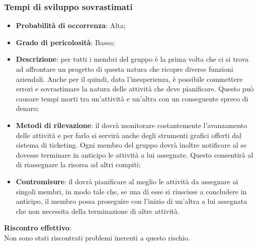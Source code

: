 		\subsubsection{Tempi di sviluppo sovrastimati} %
		\label{ssub:tempi_di_sviluppo_sovrastimati}
			\begin{itemize}
				\item \textbf{Probabilità di occorrenza}: Alta;
				\item \textbf{Grado di pericolosità}: Basso;
				\item \textbf{Descrizione}: per tutti i membri del gruppo è la prima volta che ci si trova ad affrontare un progetto di questa natura che ricopre diverse funzioni aziendali. Anche per il \roleProjectManager{} quindi, data l'inesperienza, è possibile commettere errori e sovrastimare la natura delle attività che deve pianificare. Questo può causare tempi morti tra un'attività e un'altra con un conseguente spreco di denaro;
				\item \textbf{Metodi di rilevazione}: il \roleProjectManager{} dovrà monitorare costantemente l'avanzamento delle attività e per farlo si servirà anche degli strumenti grafici offerti dal sistema di ticketing. Ogni membro del gruppo dovrà inoltre notificare al \roleProjectManager{} se dovesse terminare in anticipo le attività a lui assegnate. Questo consentirà al \roleProjectManager{} di riassegnare la risorsa ad altri compiti;
				\item \textbf{Contromisure}: il \roleProjectManager{} dovrà pianificare al meglio le attività da assegnare ai singoli membri, in modo tale che, se una di esse si riuscisse a concludere in anticipo, il membro possa proseguire con l'inizio di un'altra a lui assegnata che non necessita della terminazione di altre attività.
			\end{itemize}
		\noindent
		\textbf{Riscontro effettivo}: \\
		Non sono stati riscontrati problemi inerenti a questo rischio.
		
	\newpage
